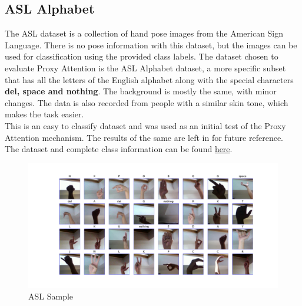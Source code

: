 \subsection{ASL Alphabet}
The ASL dataset is a collection of hand pose images from the American Sign Language. There is no pose information with this dataset, but the images can be used for classification using the provided class labels.
The dataset chosen to evaluate Proxy Attention is the ASL Alphabet dataset, a more specific subset that has all the letters of the English alphabet along with the special characters \textbf{del, space and nothing}. The background is mostly the same, with minor changes. The data is also recorded from people with a similar skin tone, which makes the task easier.\\
This is an easy to classify dataset and was used as an initial test of the Proxy Attention mechanism. The results of the same are left in for future reference. \\
The dataset and complete class information can be found \href{https://www.kaggle.com/datasets/grassknoted/asl-alphabet}{here}.
\begin{figure}[H]
    \centering
    \includegraphics[width=1\textwidth]{images/asl.pdf}
    \caption{ASL Sample}
    \label{fig:asl}

\end{figure}



